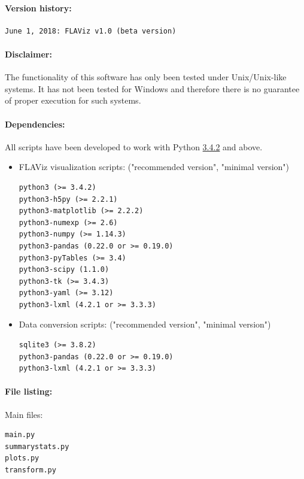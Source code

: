 \documentclass[10pt,a4paper]{article}
\begin{document}
\paragraph{Version history:}
\begin{verbatim}
June 1, 2018: FLAViz v1.0 (beta version)
\end{verbatim}


\paragraph{Disclaimer:} The functionality of this software has only been tested under Unix/Unix-like systems. It has not been tested for Windows and therefore there is no guarantee of proper execution for such systems.

\paragraph{Dependencies:}
All scripts have been developed to work with Python \url{3.4.2} and above.

\begin{itemize}
\item FLAViz visualization scripts: ("recommended version", "minimal version")

\begin{verbatim}
python3 (>= 3.4.2)
python3-h5py (>= 2.2.1)
python3-matplotlib (>= 2.2.2)
python3-numexp (>= 2.6)
python3-numpy (>= 1.14.3)
python3-pandas (0.22.0 or >= 0.19.0)
python3-pyTables (>= 3.4)
python3-scipy (1.1.0)
python3-tk (>= 3.4.3)
python3-yaml (>= 3.12)
python3-lxml (4.2.1 or >= 3.3.3)
\end{verbatim}

\item Data conversion scripts: ("recommended version", "minimal version")

\begin{verbatim}
sqlite3 (>= 3.8.2)
python3-pandas (0.22.0 or >= 0.19.0)
python3-lxml (4.2.1 or >= 3.3.3)
\end{verbatim}
\end{itemize}


\paragraph{File listing:}

\smallskip
Main files:
\begin{verbatim}
main.py
summarystats.py
plots.py
transform.py
\end{verbatim}
\end{document}
